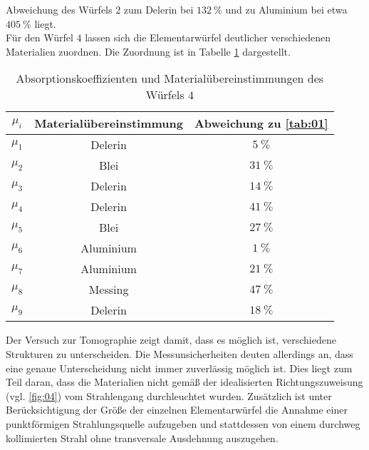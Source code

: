Abweichung des Würfels $2$ zum Delerin bei $\SI{132}{\percent}$ und zu Aluminium
bei etwa $\SI{405}{\percent}$ liegt.  \\
\noindent Für den Würfel $4$ lassen sich die Elementarwürfel deutlicher
verschiedenen Materialien zuordnen. Die Zuordnung ist in Tabelle \ref{tab:02}
dargestellt.
\FloatBarrier
\begin{table}
  \centering
  \caption{Absorptionskoeffizienten und Materialübereinstimmungen des Würfels $4$}
  \label{tab:02}
  \begin{tabular}{c c c}
    \toprule
   \multicolumn{1}{c}{$\mu_i$} & \multicolumn{1}{c}{Materialübereinstimmung }
   & \multicolumn{1}{c}{Abweichung zu \ref{tab:01}}  \\
   \midrule
    $\mu_1$ & Delerin &   $\SI{5}{\percent} $\\
    $\mu_2$ & Blei &      $\SI{31}{\percent}$ \\
    $\mu_3$ & Delerin &   $\SI{14}{\percent}$ \\
    $\mu_4$ & Delerin &   $\SI{41}{\percent}$ \\
    $\mu_5$ & Blei &      $\SI{27}{\percent}$ \\
    $\mu_6$ & Aluminium & $\SI{1}{\percent} $\\
    $\mu_7$ & Aluminium & $\SI{21}{\percent}$ \\
    $\mu_8$ & Messing &   $\SI{47}{\percent}$ \\
    $\mu_9$ & Delerin &   $\SI{18}{\percent}$ \\
\bottomrule
  \end{tabular}
\end{table}
\newpage
\FloatBarrier
\noindent Der Versuch zur Tomographie zeigt damit, dass es möglich ist,
verschiedene Strukturen zu unterscheiden. Die Messunsicherheiten deuten allerdings
an, dass eine genaue Unterscheidung nicht immer zuverlässig möglich ist. Dies
liegt zum Teil daran, dass die Materialien nicht gemäß der idealisierten
Richtungszuweisung (vgl. \ref{fig:04}) vom Strahlengang durchleuchtet wurden.
Zusätzlich ist unter Berücksichtigung der Größe der einzelnen Elementarwürfel
die Annahme einer punktförmigen Strahlungsquelle aufzugeben und stattdessen
von einem durchweg kollimierten Strahl ohne transversale Ausdehnung auszugehen.
